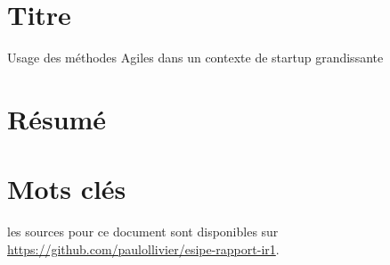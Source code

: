 \begin{titlepage}
\begin{center}
\section*{Titre}
Usage des méthodes Agiles dans un contexte de startup grandissante
\section*{Résumé}
\section*{Mots clés}

\vfill
les sources pour ce document sont disponibles sur \url{https://github.com/paulollivier/esipe-rapport-ir1}.
\end{center}
\end{titlepage}

